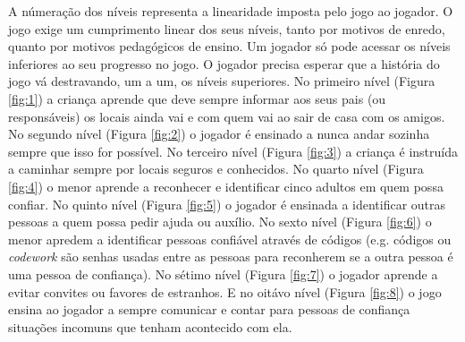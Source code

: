 A númeração dos níveis representa a linearidade imposta pelo jogo ao jogador. O jogo exige um cumprimento linear dos seus níveis, tanto por motivos de enredo, quanto por motivos pedagógicos de ensino. Um jogador só pode acessar os níveis inferiores ao seu progresso no jogo. O jogador precisa esperar que a história do jogo vá destravando, um a um, os níveis superiores. No primeiro nível (Figura \ref{fig:1}) a criança aprende que deve sempre informar aos seus pais (ou responsáveis) os locais ainda vai e com quem vai ao sair de casa com os amigos. No segundo nível (Figura \ref{fig:2}) o jogador é ensinado a nunca andar sozinha sempre que isso for possível. No terceiro nível (Figura \ref{fig:3}) a criança é instruída a caminhar sempre por locais seguros e conhecidos. No quarto nível (Figura \ref{fig:4}) o menor aprende a reconhecer e identificar cinco adultos em quem possa confiar. No quinto nível (Figura \ref{fig:5}) o jogador é ensinada a identificar outras pessoas a quem possa pedir ajuda ou auxílio. No sexto nível (Figura \ref{fig:6}) o menor apredem a identificar pessoas confiável através de códigos (e.g. códigos ou \textit{codework} são senhas usadas entre as pessoas para reconherem se a outra pessoa é uma pessoa de confiança). No sétimo nível (Figura \ref{fig:7}) o jogador aprende a evitar convites ou favores de estranhos. E no oitávo nível (Figura \ref{fig:8}) o jogo ensina ao jogador a sempre comunicar e contar para pessoas de confiança situações incomuns que tenham acontecido com ela. 




